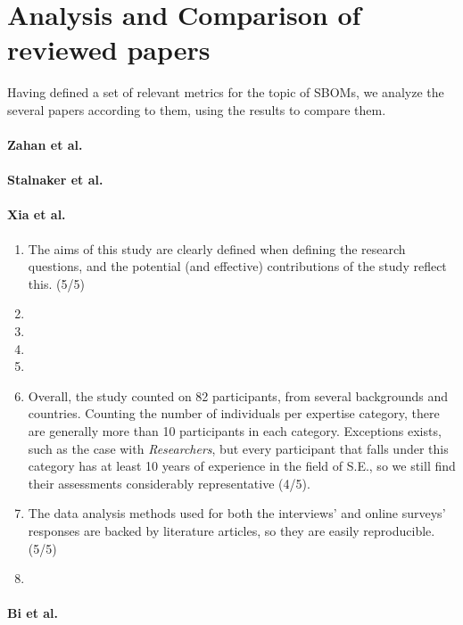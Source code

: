\section{Analysis and Comparison of reviewed papers} \label{analysis}

\noindent Having defined a set of relevant metrics for the topic of SBOMs, we analyze the several papers according to them, using the results to compare them.

\paragraph{Zahan et al. \cite{article:sbom-required}}

\paragraph{Stalnaker et al. \cite{article:software-bom}}

\paragraph{Xia et al. \cite{article:sbom-study}}

\begin{enumerate}
    \item The aims of this study are clearly defined when defining the research questions, and the potential (and effective) contributions of the study reflect this. (5/5)
    \item
    \item
    \item
    \item
    \item Overall, the study counted on 82 participants, from several backgrounds and countries. Counting the number of individuals per expertise category, there are generally more than 10 participants in each category. Exceptions exists, such as the case with \emph{Researchers}, but every participant that falls under this category has at least 10 years of experience in the field of S.E., so we still find their assessments considerably representative (4/5).
    \item The data analysis methods used for both the interviews' and online surveys' responses are backed by literature articles, so they are easily reproducible. (5/5)
    \item
\end{enumerate}

\paragraph{Bi et al. \cite{article:sboms-issues-solutions}}

